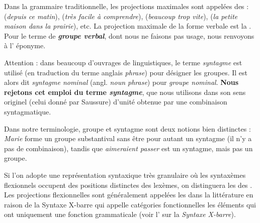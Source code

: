 Dans la grammaire traditionnelle, les projections maximales sont appelées des :  (\textit{depuis ce matin}),  (\textit{très facile à comprendre}),  (\textit{beaucoup trop vite}),  (\textit{la petite maison dans la prairie}), etc. La projection maximale de la forme verbale est la . Pour le terme de \textbf{\textit{groupe verbal}}, dont nous ne faisons pas usage, nous renvoyons à l’ éponyme.

\Definition{}
{Attention : dans beaucoup d’ouvrages de linguistiques, le terme \textit{syntagme} est utilisé (en traduction du terme anglais \textit{phrase}) pour désigner les groupes. Il est alors dit \textit{syntagme nominal} (angl. \textit{noun phrase}) pour \textit{groupe nominal}. \textbf{Nous rejetons cet emploi du terme \textit{syntagme}}, que nous utilisons dans son sens originel (celui donné par Saussure) d’unité obtenue par une combinaison syntagmatique.}

Dans notre terminologie, groupe et syntagme sont deux notions bien distinctes : \textit{Marie} forme un groupe substantival sans être pour autant un syntagme (il n’y a pas de combinaison), tandis que \textit{aimeraient passer} est un syntagme, mais pas un groupe.

Si l’on adopte une représentation syntaxique très granulaire où les syntaxèmes flexionnels occupent des positions distinctes des lexèmes, on distinguera les  des . Les projections flexionnelles sont généralement appelées les  dans la littérature en raison de la Syntaxe X-barre qui appelle catégories fonctionnelles les éléments qui ont uniquement une fonction grammaticale (voir l’ sur la \textit{Syntaxe X-barre}).



